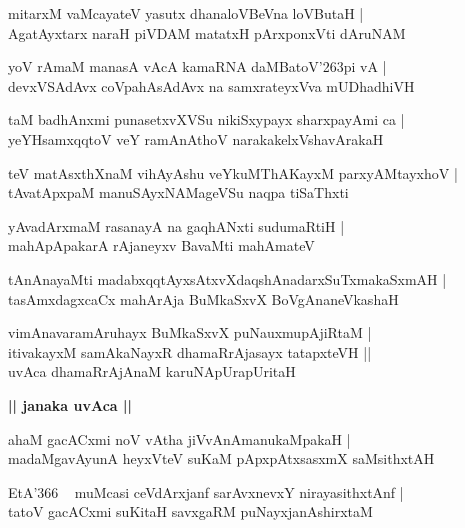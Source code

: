 \documentclass[twoside,12pt,openright]{book}
\def\S{\char'263}
\newcounter{shloka}[chapter]
\def\uvaca#1{\centerline{{\large\textbf{#1}}}}
\begin{document}
\begin{shloka}%
mitarxM vaMcayateV yasutx dhanaloVBeVna loVButaH |\\
AgatAyxtarx naraH piVDAM matatxH pArxponxVti dAruNAM 
\end{shloka}

\begin{shloka}%
yoV rAmaM manasA vAcA kamaRNA daMBatoV\S pi vA |\\
devxVSAdAvx coVpahAsAdAvx na samxrateyxVva mUDhadhiVH
\end{shloka}

\begin{shloka}%
taM badhAnxmi punasetxvXVSu nikiSxypayx sharxpayAmi ca |\\
yeYHsamxqqtoV  veY ramAnAthoV narakakelxVshavArakaH
\end{shloka}

\begin{shloka}%
teV matAsxthXnaM vihAyAshu veYkuMThAKayxM parxyAMtayxhoV |\\
tAvatApxpaM manuSAyxNAMageVSu naqpa tiSaThxti
\end{shloka}

\begin{shloka}%
yAvadArxmaM rasanayA na gaqhANxti sudumaRtiH |\\
mahApApakarA rAjaneyxv BavaMti mahAmateV 
\end{shloka}

\begin{shloka}%
tAnAnayaMti madabxqqtAyxsAtxvXdaqshAnadarxSuTxmakaSxmAH |\\
tasAmxdagxcaCx mahArAja BuMkaSxvX BoVgAnaneVkashaH 
\end{shloka}

\begin{shloka}%
vimAnavaramAruhayx BuMkaSxvX puNauxmupAjiRtaM |\\
itivakayxM samAkaNayxR dhamaRrAjasayx tatapxteVH ||\\
uvAca dhamaRrAjAnaM karuNApUrapUritaH 
\end{shloka}

\uvaca{|| janaka uvAca ||}

\begin{shloka}%
ahaM gacACxmi noV  vAtha jiVvAnAmanukaMpakaH |\\
madaMgavAyunA heyxVteV suKaM pApxpAtxsasxmX saMsithxtAH 
\end{shloka}

\begin{shloka}%
EtA\char'366 ~ muMcasi ceVdArxjanf sarAvxnevxY nirayasithxtAnf |\\
tatoV gacACxmi suKitaH savxgaRM puNayxjanAshirxtaM 
\end{shloka}
\end{document}
